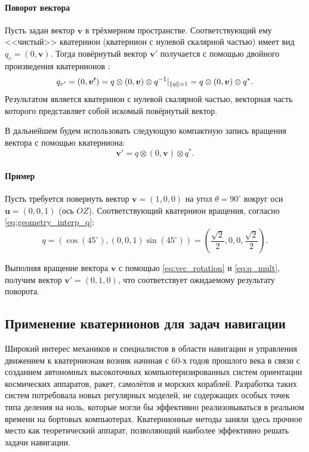 \paragraph{Поворот вектора}
Пусть задан вектор $\bm{v}$ в трёхмерном пространстве. Соответствующий ему <<чистый>> кватернион (кватернион с нулевой скалярной частью) имеет вид $q_v = (0, \bm{v})$. Тогда повёрнутый вектор $\bm{v'}$ получается с помощью двойного произведения кватернионов \cite{salamin1974quaternions, lee1991stereo}:
\begin{equation*}
	q_{v'} = (0, \bm{v'}) = q \otimes (0, \bm{v}) \otimes q^{-1} |_{\norm{q} = 1} = q \otimes (0, \bm{v}) \otimes q^{*} \text{.}
\end{equation*}
Результатом является кватернион с нулевой скалярной частью, векторная часть которого представляет собой искомый повёрнутый вектор.

В дальнейшем будем использовать следующую компактную запись вращения вектора с помощью кватерниона:
\begin{equation}
	\label{eq:vec_rotation}
	\bm{v'} = q \otimes (0, \bm{v}) \otimes q^{*} \text{.}
\end{equation}


\paragraph{Пример}
Пусть требуется повернуть вектор $\bm{v} = (1, 0, 0)$ на угол $\theta = 90 ^\circ$ вокруг оси $\bm{u} = (0, 0, 1)$ (ось $OZ$). Соответствующий кватернион вращения, согласно \eqref{eq:geometry_interp_q}:
\begin{equation*}
	q = \left( \cos(45 ^\circ), (0, 0, 1) \sin(45 ^\circ) \right) = \left( \frac{\sqrt{2}}{2}, 0, 0, \frac{\sqrt{2}}{2} \right) \text{.}
\end{equation*}

Выполняя вращение вектора $\bm{v}$ с помощью \eqref{eq:vec_rotation} и \eqref{eq:q_mult}, получим вектор $\bm{v'} = (0, 1, 0)$, что соответствует ожидаемому результату поворота.


\subsection{Применение кватернионов для задач навигации}

Широкий интерес механиков и специалистов в области навигации и управления движением к кватернионам возник начиная с 60-х годов прошлого века в связи с созданием автономных высокоточных компьютеризированных систем ориентации космических аппаратов, ракет, самолётов и морских кораблей. Разработка таких систем потребовала новых регулярных моделей, не содержащих особых точек типа деления на ноль, которые могли бы эффективно реализовываться в реальном времени на бортовых компьютерах. Кватернионные методы заняли здесь прочное место как теоретический аппарат, позволяющий наиболее эффективно решать задачи навигации.


